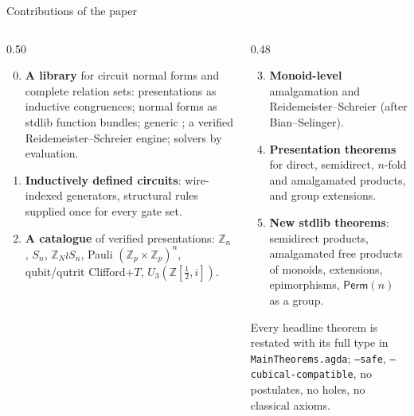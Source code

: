 \begin{frame}{Contributions of the paper \InPaper}
\small
\begin{columns}[T]
\begin{column}{0.50\textwidth}
\begin{enumerate}
  \setcounter{enumi}{-1}
  \setlength{\itemsep}{4pt}
  \item \textbf{A library} for circuit normal forms and complete relation
        sets: presentations as inductive congruences; normal forms as stdlib
        function bundles; generic ; a verified
        Reidemeister--Schreier engine; solvers by evaluation.
  \item \textbf{Inductively defined circuits}: wire-indexed generators,
        structural rules supplied once for every gate set.
  \item \textbf{A catalogue} of verified presentations: $\mathbb{Z}_n$,
        $S_n$, $\mathbb{Z}_N\wr S_n$, Pauli $(\mathbb{Z}_p{\times}\mathbb{Z}_p)^n$,
        qubit/qutrit Clifford+$T$, $U_3(\mathbb{Z}[\frac12,i])$.
\end{enumerate}
\end{column}
\begin{column}{0.48\textwidth}
\begin{enumerate}
  \setcounter{enumi}{2}
  \setlength{\itemsep}{4pt}
  \item \textbf{Monoid-level} amalgamation and Reidemeister--Schreier
        (after Bian--Selinger).
  \item \textbf{Presentation theorems} for direct, semidirect, $n$-fold and
        amalgamated products, and group extensions.
  \item \textbf{New stdlib theorems}: semidirect products, amalgamated free
        products of monoids, extensions, epimorphisms, $\mathsf{Perm}(n)$ as a group.
\end{enumerate}
\vspace{4pt}
\begin{paperbox}
Every headline theorem is restated with its full type in
\texttt{MainTheorems.agda}; \texttt{--safe}, \texttt{--cubical-compatible},
no postulates, no holes, no classical axioms.
\end{paperbox}
\end{column}
\end{columns}
\end{frame}
